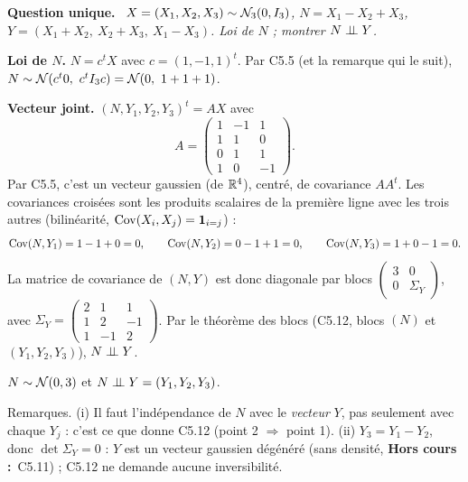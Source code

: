 \documentclass[11pt,a4paper]{article}
\newcommand{\question}[1]{\par\medskip\noindent\textbf{Question #1.}~}
\newcommand{\hc}{\textbf{Hors cours :}~}
\begin{document}
\begin{exo}[$N$ indépendant de $Y$]

\question{unique} \emph{$X=(X_1,X_2,X_3)\sim\mathcal{N}_3(0,I_3)$, $N=X_1-X_2+X_3$, $Y=(X_1+X_2,\ X_2+X_3,\ X_1-X_3)$. Loi de $N$ ; montrer $N\perp\!\!\!\perp Y$.}

\textbf{Loi de $N$.} $N=c^tX$ avec $c=(1,-1,1)^t$. Par C5.5 (et la remarque qui le suit), $N\sim\Nc(c^t0,\ c^tI_3c)=\Nc(0,\ 1+1+1)$.

\textbf{Vecteur joint.} $(N,Y_1,Y_2,Y_3)^t=AX$ avec
\[A=\begin{pmatrix}1&-1&1\\1&1&0\\0&1&1\\1&0&-1\end{pmatrix}.\]
Par C5.5, c'est un vecteur gaussien (de $\mathbb{R}^4$), centré, de covariance $AA^t$. Les covariances croisées sont les produits scalaires de la
première ligne avec les trois autres (bilinéarité, $\operatorname{Cov}(X_i,X_j)=\mathbf{1}_{i=j}$) :
\[\operatorname{Cov}(N,Y_1)=1-1+0=0,\qquad\operatorname{Cov}(N,Y_2)=0-1+1=0,\qquad\operatorname{Cov}(N,Y_3)=1+0-1=0 .\]
La matrice de covariance de $(N,Y)$ est donc diagonale par blocs $\begin{pmatrix}3&0\\0&\Sigma_Y\end{pmatrix}$, avec
$\Sigma_Y=\begin{pmatrix}2&1&1\\1&2&-1\\1&-1&2\end{pmatrix}$. Par le théorème des blocs (C5.12, blocs $(N)$ et $(Y_1,Y_2,Y_3)$), $N\perp\!\!\!\perp Y$.
\begin{resultat}
$N\sim\mathcal{N}(0,3)$ et $N\perp\!\!\!\perp Y=(Y_1,Y_2,Y_3)$.
\end{resultat}
Remarques. (i) Il faut l'indépendance de $N$ avec le \emph{vecteur} $Y$, pas seulement avec chaque $Y_j$ : c'est ce que donne C5.12
(point 2 $\Rightarrow$ point 1). (ii) $Y_3=Y_1-Y_2$, donc $\det\Sigma_Y=0$ : $Y$ est un vecteur gaussien dégénéré (sans densité, \hc C5.11) ;
C5.12 ne demande aucune inversibilité.
\end{exo}
\end{document}
